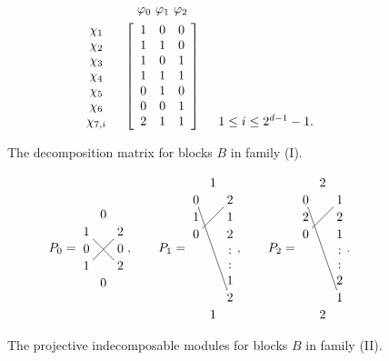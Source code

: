 \documentclass{amsart}
\theoremstyle{plain}
\theoremstyle{definition}
\theoremstyle{remark}
\begin{document}
\begin{figure}[ht]  
\caption{\label{fig:decompsl1} The decomposition matrix for blocks $B$
in family (I).}
$$\begin{array}{ccc}
&\begin{array}{c@{}c@{}c}\varphi_0\,&\,\varphi_1\,&\,\varphi_2\end{array}\\[1ex]
\begin{array}{c}\chi_1\\ \chi_2\\ \chi_3 \\ \chi_4\\ \chi_5\\ \chi_6\\ \chi_{7,i}\end{array} &
\left[\begin{array}{ccc}1&0&0\\1&1&0\\1&0&1\\1&1&1\\0&1&0\\0&0&1\\2&1&1\end{array}\right]
 &\begin{array}{c}\\ \\ \\ \\ \\ \\1\le i\le 2^{d-1}-1.\end{array}\end{array}$$
\end{figure}
\begin{figure}[ht] 
\caption{\label{fig:psl2B} The projective indecomposable
modules for blocks $B$ in family (II).}
$$P_0=\vcenter{ \xymatrix @R=.1pc @C=.2pc{&0&\\
1\ar@{-}[rrdd]&&2\ar@{-}[lldd]\\0&&0\\1&&2\\&0&}},
\qquad P_1=\vcenter{ \xymatrix @R=.1pc @C=.2pc{&1&\\0\ar@{-}[rrdddddd]&&2\ar@{-}[lldd]\\
1&&1\\0&&2\\&&:\\&&:\\&&1\\&&2\\&1&}}, \qquad 
P_2=\vcenter{ \xymatrix @R=.1pc @C=.2pc{&2&\\0\ar@{-}[rrdddddd]&&1\ar@{-}[lldd]\\
2&&2\\0&&1\\&&:\\&&:\\&&2\\&&1\\&2&}}.$$
\end{figure}
\end{document}
